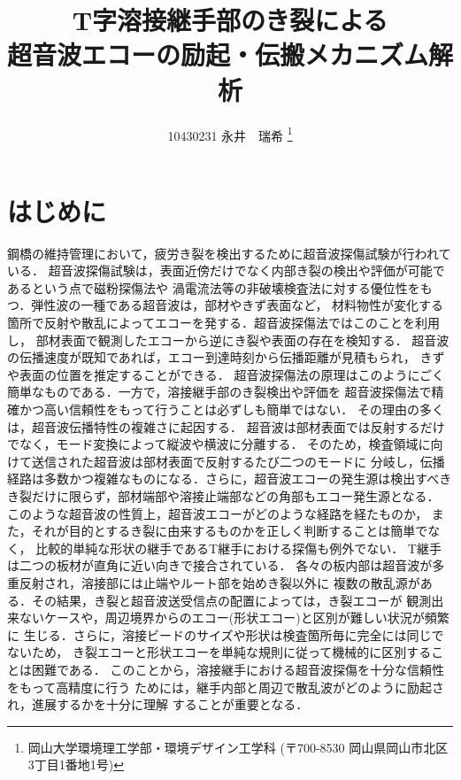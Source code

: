 \documentclass{jsce}
\title{
T字溶接継手部のき裂による\\
超音波エコーの励起・伝搬メカニズム解析
}%
\author{
 10430231  永井　瑞希
\thanks{岡山大学環境理工学部・環境デザイン工学科 (〒700-8530 岡山県岡山市北区3丁目1番地1号)}
}
\begin{document}
\maketitle
\section{はじめに}
鋼橋の維持管理において，疲労き裂を検出するために超音波探傷試験が行われている．
超音波探傷試験は，表面近傍だけでなく内部き裂の検出や評価が可能であるという点で磁粉探傷法や
渦電流法等の非破壊検査法に対する優位性をもつ．弾性波の一種である超音波は，部材やきず表面など，
材料物性が変化する箇所で反射や散乱によってエコーを発する．超音波探傷法ではこのことを利用し，
部材表面で観測したエコーから逆にき裂や表面の存在を検知する．
超音波の伝播速度が既知であれば，エコー到達時刻から伝播距離が見積もられ，
きずや表面の位置を推定することができる．
超音波探傷法の原理はこのようにごく簡単なものである．一方で，溶接継手部のき裂検出や評価を
超音波探傷法で精確かつ高い信頼性をもって行うことは必ずしも簡単ではない．
その理由の多くは，超音波伝播特性の複雑さに起因する．
超音波は部材表面では反射するだけでなく，モード変換によって縦波や横波に分離する．
そのため，検査領域に向けて送信された超音波は部材表面で反射するたび二つのモードに
分岐し，伝播経路は多数かつ複雑なものになる．さらに，超音波エコーの発生源は検出すべき
き裂だけに限らず，部材端部や溶接止端部などの角部もエコー発生源となる．
このような超音波の性質上，超音波エコーがどのような経路を経たものか，
また，それが目的とするき裂に由来するものかを正しく判断することは簡単でなく，
比較的単純な形状の継手であるT継手における探傷も例外でない．
T継手は二つの板材が直角に近い向きで接合されている．
各々の板内部は超音波が多重反射され，溶接部には止端やルート部を始めき裂以外に
複数の散乱源がある．その結果，き裂と超音波送受信点の配置によっては，き裂エコーが
観測出来ないケースや，周辺境界からのエコー(形状エコー)と区別が難しい状況が頻繁に
生じる．さらに，溶接ビードのサイズや形状は検査箇所毎に完全には同じでないため，
き裂エコーと形状エコーを単純な規則に従って機械的に区別することは困難である．
このことから，溶接継手における超音波探傷を十分な信頼性をもって高精度に行う
ためには，継手内部と周辺で散乱波がどのように励起され，進展するかを十分に理解
することが重要となる．
\end{document}
